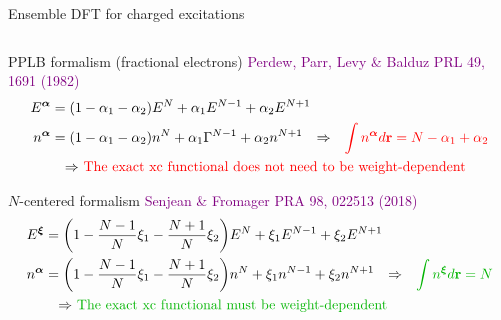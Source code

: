 \documentclass[aspectratio=169,9pt]{beamer}
\newcommand{\br}{\mathbf{r}}
\newcommand{\green}[1]{\textcolor{darkgreen}{#1}}
\newcommand{\red}[1]{\textcolor{red}{#1}}
\newcommand{\pub}[1]{{\small \textcolor{purple}{#1}}}
\begin{document}
\begin{frame}{Ensemble DFT for charged excitations}
        \begin{columns}
                \begin{column}{0.80\textwidth}
		\begin{block}{PPLB formalism (fractional electrons)}
		\pub{Perdew, Parr, Levy \& Balduz PRL 49, 1691 (1982)}
        \begin{align*}
                E^{\bm{\alpha}} & = \qty(1 - \alpha_1 - \alpha_2) E^{N} + \alpha_1 E^{N-1} + \alpha_2 E^{N+1}
                        \\
                n^{\bm{\alpha}} & = \qty(1 - \alpha_1 - \alpha_2) n^{N} + \alpha_1 \Gamma^{N-1} + \alpha_2 n^{N+1}
                        \qq{$\Rightarrow$} \red{\int n^{\bm{\alpha}} d\br{} = N - \alpha_1 + \alpha_2}
                        \\
                        & \qq{$\Rightarrow$ \red{The exact xc functional does not need to be weight-dependent}}
        \end{align*}

        \end{block}
		\begin{block}{$N$-centered formalism}
		\pub{Senjean \& Fromager PRA 98, 022513 (2018)}
        \begin{align*}
                E^{\bm{\xi}} & = \qty(1 - \frac{N-1}{N} \xi_1 - \frac{N+1}{N} \xi_2) E^{N} + \xi_1 E^{N-1} + \xi_2 E^{N+1}
                \\
                        n^{\bm{\alpha}} & = \qty(1 - \frac{N-1}{N} \xi_1 - \frac{N+1}{N} \xi_2) n^{N} + \xi_1 n^{N-1} + \xi_2 n^{N+1}
                        \qq{$\Rightarrow$} \green{\int n^{\bm{\xi}} d\br{} = N}
                        \\
                        & \qq{$\Rightarrow$ \green{The exact xc functional must be weight-dependent}}
        \end{align*}
        \end{block}
        \end{column}


\end{columns}
\end{frame}
\end{document}
